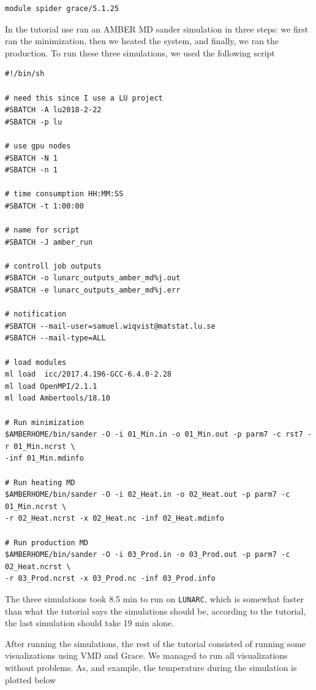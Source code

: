 \documentclass[11pt]{article}
\begin{document}
\begin{verbatim}
module spider grace/5.1.25
\end{verbatim}

In the tutorial use ran an AMBER MD sander simulation in three steps: we
first ran the minimization, then we heated the system, and finally, we
ran the production. To run these three simulations, we used the
following script

\begin{verbatim}
#!/bin/sh

# need this since I use a LU project
#SBATCH -A lu2018-2-22
#SBATCH -p lu

# use gpu nodes
#SBATCH -N 1
#SBATCH -n 1

# time consumption HH:MM:SS
#SBATCH -t 1:00:00

# name for script
#SBATCH -J amber_run

# controll job outputs
#SBATCH -o lunarc_outputs_amber_md%j.out
#SBATCH -e lunarc_outputs_amber_md%j.err

# notification
#SBATCH --mail-user=samuel.wiqvist@matstat.lu.se
#SBATCH --mail-type=ALL

# load modules
ml load  icc/2017.4.196-GCC-6.4.0-2.28
ml load OpenMPI/2.1.1
ml load Ambertools/18.10

# Run minimization
$AMBERHOME/bin/sander -O -i 01_Min.in -o 01_Min.out -p parm7 -c rst7 -r 01_Min.ncrst \
-inf 01_Min.mdinfo

# Run heating MD
$AMBERHOME/bin/sander -O -i 02_Heat.in -o 02_Heat.out -p parm7 -c 01_Min.ncrst \
-r 02_Heat.ncrst -x 02_Heat.nc -inf 02_Heat.mdinfo

# Run production MD
$AMBERHOME/bin/sander -O -i 03_Prod.in -o 03_Prod.out -p parm7 -c 02_Heat.ncrst \
-r 03_Prod.ncrst -x 03_Prod.nc -inf 03_Prod.info 
\end{verbatim}

The three simulations took 8.5 min to run on \texttt{LUNARC}, which is
somewhat faster than what the tutorial says the simulations should be,
according to the tutorial, the last simulation should take 19 min alone.

After running the simulations, the rest of the tutorial consisted of
running some visualizations using VMD and Grace. We managed to run all
visualizations without problems. As, and example, the temperature during
the simulation is plotted below
\end{document}
